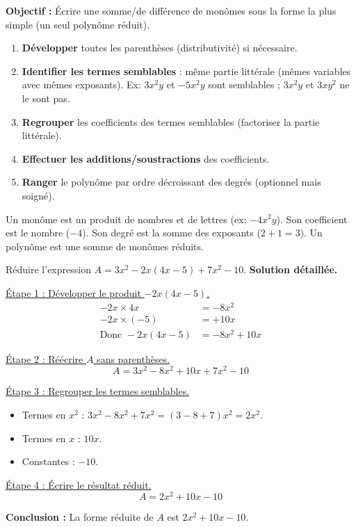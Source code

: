 \documentclass[11pt]{article}
\newcommand{\cle}[1]{{\popxbold\color{popdark}#1}}
\begin{document}
\begin{methode}
    \textbf{Objectif :} Écrire une somme/de différence de monômes sous la forme la plus simple (un seul polynôme réduit).
    \begin{enumerate}
        \item \textbf{Développer} toutes les parenthèses (distributivité) si nécessaire.
        \item \textbf{Identifier les termes semblables} : même partie littérale (mêmes variables avec mêmes exposants). Ex: $3x^2y$ et $-5x^2y$ sont semblables ; $3x^2y$ et $3xy^2$ ne le sont pas.
        \item \textbf{Regrouper} les coefficients des termes semblables (factoriser la partie littérale).
        \item \textbf{Effectuer les additions/soustractions} des coefficients.
        \item \textbf{Ranger} le polynôme par ordre décroissant des degrés (optionnel mais soigné).
    \end{enumerate}
    \begin{aretenir}[Vocabulaire] Un \cle{monôme} est un produit de nombres et de lettres (ex: $-4x^2y$). Son \cle{coefficient} est le nombre ($-4$). Son \cle{degré} est la somme des exposants ($2+1=3$). Un \cle{polynôme} est une somme de monômes réduits.
    \end{aretenir}
\end{methode}

\begin{exoresolu}
Réduire l'expression $A = 3x^2 - 2x(4x - 5) + 7x^2 - 10$.
\tcblower
\textbf{Solution détaillée.}

\underline{Étape 1 : Développer le produit $-2x(4x - 5)$.}
\begin{align*}
-2x \times 4x &= -8x^2 \\
-2x \times (-5) &= +10x \\
\text{Donc } -2x(4x - 5) &= -8x^2 + 10x
\end{align*}

\underline{Étape 2 : Réécrire $A$ sans parenthèses.}
\[ A = 3x^2 - 8x^2 + 10x + 7x^2 - 10 \]

\underline{Étape 3 : Regrouper les termes semblables.}
\begin{itemize}
    \item Termes en $x^2$ : $3x^2 - 8x^2 + 7x^2 = (3 - 8 + 7)x^2 = 2x^2$.
    \item Termes en $x$ : $10x$.
    \item Constantes : $-10$.
\end{itemize}

\underline{Étape 4 : Écrire le résultat réduit.}
\[ A = 2x^2 + 10x - 10 \]

\textbf{Conclusion :} La forme réduite de $A$ est $2x^2 + 10x - 10$.
\end{exoresolu}
\end{document}
